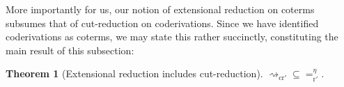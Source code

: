 \documentclass[10pt,a4paper]{amsart}
\theoremstyle{plain}
\newtheorem{theorem}[theorem]{Theorem}
\theoremstyle{definition}
\newcommand{\gianluca}[1]{\todo[color=purple]{G: #1}}
\renewcommand{\todo}[1]{}
\renewcommand{\gianluca}[1]{}
\theoremstyle{plain}
\theoremstyle{definition} %
\newcommand{\closure}[1]{\langle #1 \rangle}
\newcommand{\nat}{\mathit{N}}
\newcommand{\N}{\nat} %
\newcommand{\seqar}{\Rightarrow}
\newcommand{\LJ}{\mathsf{LJ}}
\newcommand{\muLJ}{\mu\LJ}
\newcommand{\circular}{\mathsf C}
\newcommand{\cmuLJ}{\circular\muLJ}
\newcommand{\cmuLJneg}{\cmuLJ^-}
\newcommand{\rewrite}{\rightsquigarrow}
\newcommand{\cutreductionnorec}{\mathrm{cr}'}
\newcommand{\cutrednorec}{\rewrite_{\cutreductionnorec}}
\newcommand{\cutconvnorec}{=_{\cutreductionnorec}}
\newcommand{\reductionnorec}{\mathrm{r}'}
\newcommand{\convertsnorec}{=_{\reductionnorec}}
\newcommand{\convertsnoreceta}{=_{\reductionnorec}^\eta} %
\newcommand{\der}{P}
\begin{document}
More importantly for us, our notion of extensional reduction on coterms subsumes that of cut-reduction on coderivations.
Since we have identified coderivations as coterms, we may state this rather succinctly, constituting the main result of this subsection:
\begin{theorem}
[Extensional reduction includes cut-reduction]
\label{thm:reduction-inludes-cut-elimination}
${\cutrednorec}\subseteq {\convertsnoreceta}$.
\end{theorem}
\end{document}
